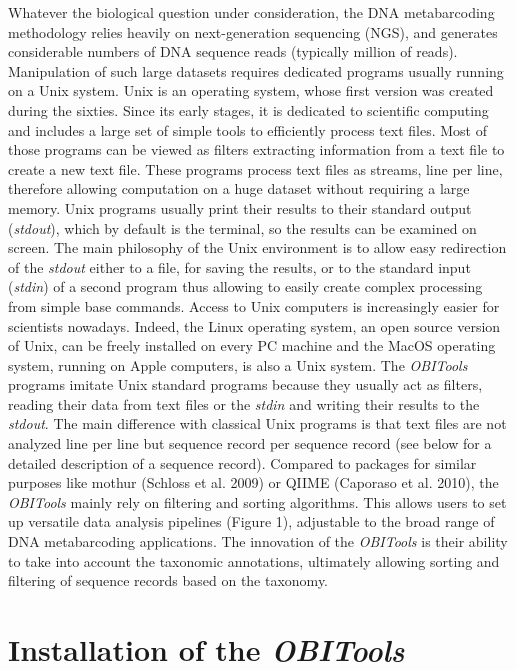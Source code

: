 \documentclass[
  letterpaper,
  DIV=11,
  numbers=noendperiod]{scrreprt}
\begin{document}
Whatever the biological question under consideration, the DNA
metabarcoding methodology relies heavily on next-generation sequencing
(NGS), and generates considerable numbers of DNA sequence reads
(typically million of reads). Manipulation of such large datasets
requires dedicated programs usually running on a Unix system. Unix is an
operating system, whose first version was created during the sixties.
Since its early stages, it is dedicated to scientific computing and
includes a large set of simple tools to efficiently process text files.
Most of those programs can be viewed as filters extracting information
from a text file to create a new text file. These programs process text
files as streams, line per line, therefore allowing computation on a
huge dataset without requiring a large memory. Unix programs usually
print their results to their standard output (\emph{stdout}), which by
default is the terminal, so the results can be examined on screen. The
main philosophy of the Unix environment is to allow easy redirection of
the \emph{stdout} either to a file, for saving the results, or to the
standard input (\emph{stdin}) of a second program thus allowing to
easily create complex processing from simple base commands. Access to
Unix computers is increasingly easier for scientists nowadays. Indeed,
the Linux operating system, an open source version of Unix, can be
freely installed on every PC machine and the MacOS operating system,
running on Apple computers, is also a Unix system. The \emph{OBITools}
programs imitate Unix standard programs because they usually act as
filters, reading their data from text files or the \emph{stdin} and
writing their results to the \emph{stdout}. The main difference with
classical Unix programs is that text files are not analyzed line per
line but sequence record per sequence record (see below for a detailed
description of a sequence record). Compared to packages for similar
purposes like mothur (Schloss et al. 2009) or QIIME (Caporaso et al.
2010), the \emph{OBITools} mainly rely on filtering and sorting
algorithms. This allows users to set up versatile data analysis
pipelines (Figure 1), adjustable to the broad range of DNA metabarcoding
applications. The innovation of the \emph{OBITools} is their ability to
take into account the taxonomic annotations, ultimately allowing sorting
and filtering of sequence records based on the taxonomy.

\hypertarget{installation-of-the-obitools}{%
\chapter{\texorpdfstring{Installation of the
\emph{OBITools}}{Installation of the OBITools}}\label{installation-of-the-obitools}}
\end{document}
